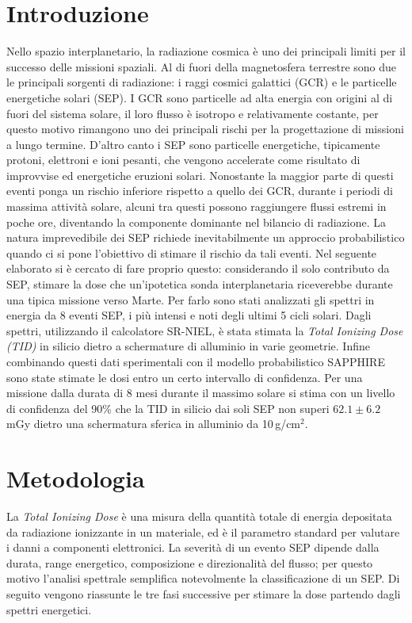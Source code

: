 \documentclass[a4paper,12pt]{article}
\begin{document}
\section*{Introduzione}
Nello spazio interplanetario, la radiazione cosmica è uno dei principali limiti per il successo delle missioni spaziali. Al di fuori della magnetosfera terrestre sono due le principali sorgenti di radiazione: i raggi cosmici galattici (GCR) e le particelle energetiche solari (SEP). I GCR sono particelle ad alta energia con origini al di fuori del sistema solare, il loro flusso è isotropo e relativamente costante, per questo motivo rimangono uno dei principali rischi per la progettazione di missioni a lungo termine. D'altro canto i SEP sono particelle energetiche, tipicamente protoni, elettroni e ioni pesanti, che vengono accelerate come risultato di improvvise ed energetiche eruzioni solari. Nonostante la maggior parte di questi eventi ponga un rischio inferiore rispetto a quello dei GCR, durante i periodi di massima attività solare, alcuni tra questi possono raggiungere flussi estremi in poche ore, diventando la componente dominante nel bilancio di radiazione. La natura imprevedibile dei SEP richiede inevitabilmente un approccio probabilistico quando ci si pone l'obiettivo di stimare il rischio da tali eventi. Nel seguente elaborato si è cercato di fare proprio questo: considerando il solo contributo da SEP, stimare la dose che un'ipotetica sonda interplanetaria riceverebbe durante una tipica missione verso Marte. Per farlo sono stati analizzati gli spettri in energia da 8 eventi SEP, i più intensi e noti degli ultimi 5 cicli solari. Dagli spettri, utilizzando il calcolatore SR-NIEL, è stata stimata la \textit{Total Ionizing Dose (TID)} in silicio dietro a schermature di alluminio in varie geometrie. Infine combinando questi dati sperimentali con il modello probabilistico SAPPHIRE sono state stimate le dosi entro un certo intervallo di confidenza.
Per una missione dalla durata di 8 mesi durante il massimo solare si stima con un livello di confidenza del 90\% che la TID in silicio dai soli SEP non superi $62.1\pm6.2$ mGy dietro una schermatura sferica in alluminio da 10\,g/cm$^2$.





\section*{Metodologia}
La \emph{Total Ionizing Dose} è una misura della quantità totale di energia depositata da radiazione 
ionizzante in un materiale, ed è il parametro standard per valutare i danni a componenti elettronici. 
La severità di un evento SEP dipende dalla durata, range energetico, composizione e 
direzionalità del flusso; per questo motivo l'analisi spettrale semplifica notevolmente la 
classificazione di un SEP. Di seguito vengono riassunte le tre fasi successive per stimare la dose partendo 
dagli spettri energetici.
\end{document}
